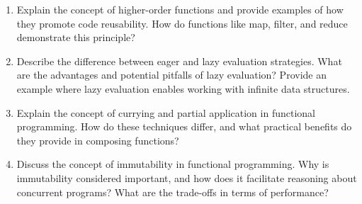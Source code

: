 \documentclass[11pt]{article}
\begin{document}
\begin{enumerate}[label=\textbf{\arabic*.}]
  \item Explain the concept of higher-order functions and provide examples of how they promote 
  code reusability. How do functions like map, filter, and reduce demonstrate this principle?

  \item Describe the difference between eager and lazy evaluation strategies. What are the 
  advantages and potential pitfalls of lazy evaluation? Provide an example where lazy evaluation 
  enables working with infinite data structures.

  \item Explain the concept of currying and partial application in functional programming. How do 
  these techniques differ, and what practical benefits do they provide in composing functions?

  \item Discuss the concept of immutability in functional programming. Why is immutability considered 
  important, and how does it facilitate reasoning about concurrent programs? What are the trade-offs 
  in terms of performance?

\end{enumerate}
\end{document}
